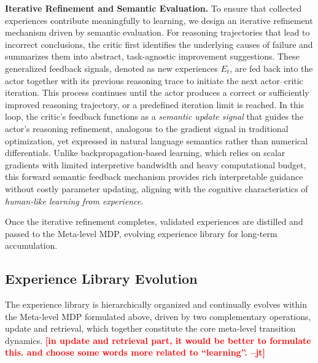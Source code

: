 \documentclass{article}
\newcommand{\jiangtao}[1]{\textcolor{red}{\bf \small [#1 --jt]}}
\begin{document}
\textbf{Iterative Refinement and Semantic Evaluation.}
To ensure that collected experiences contribute meaningfully to learning, we design an iterative refinement mechanism driven by semantic evaluation.
For reasoning trajectories that lead to incorrect conclusions, the critic first identifies the underlying causes of failure and summarizes them into abstract, task-agnostic improvement suggestions.
These generalized feedback signals, denoted as new experiences $E_t$, are fed back into the actor together with its previous reasoning trace to initiate the next actor–critic iteration.
This process continues until the actor produces a correct or sufficiently improved reasoning trajectory, or a predefined iteration limit is reached.
In this loop, the critic’s feedback functions as a \emph{semantic update signal} that guides the actor’s reasoning refinement, analogous to the gradient signal in traditional optimization, yet expressed in natural language semantics rather than numerical differentials.
Unlike backpropagation-based learning, which relies on scalar gradients with limited interpretive bandwidth and heavy computational budget, this forward semantic feedback mechanism provides rich interpretable guidance without costly parameter updating, aligning with the cognitive characteristics of \textit{human-like learning from experience}.

Once the iterative refinement completes, validated experiences are distilled and passed to the Meta-level MDP, evolving experience library for long-term accumulation.


\subsection{Experience Library Evolution}
The experience library is hierarchically organized and continually evolves within the Meta-level MDP formulated above, driven by two complementary operations, update and retrieval, which together constitute the core meta-level transition dynamics.
\jiangtao{in update and retrieval part, it would be better to formulate this. and choose some words more related to ``learning''.}
\end{document}
